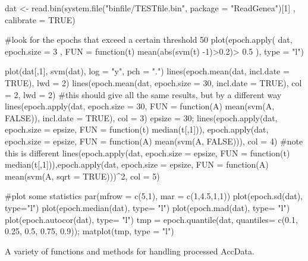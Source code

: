 \documentclass[a4paper]{book}
\begin{document}
%
\begin{Examples}
\begin{ExampleCode}

dat <- read.bin(system.file("binfile/TESTfile.bin", package = "ReadGenea")[1]
    , calibrate = TRUE)

#look for the epochs that exceed a certain threshold 50%
plot(epoch.apply( dat, epoch.size = 3 , 
    FUN = function(t) mean(abs(svm(t) -1)>0.2)> 0.5 ), type = "l")

plot(dat[,1], svm(dat), log = "y", pch = ".")
lines(epoch.mean(dat, incl.date = TRUE), lwd = 2)
lines(epoch.mean(dat, epoch.size = 30, incl.date = TRUE), col = 2, lwd = 2)
#this should give all the same results, but by a different way
lines(epoch.apply(dat, epoch.size = 30, 
    FUN = function(A) mean(svm(A, FALSE)), incl.date = TRUE), col = 3)
epsize = 30; lines(epoch.apply(dat, epoch.size = epsize, 
    FUN = function(t) median(t[,1])), epoch.apply(dat, epoch.size = epsize, 
    FUN = function(A) mean(svm(A, FALSE))), col = 4)
#note this is different
lines(epoch.apply(dat, epoch.size = epsize, 
    FUN = function(t) median(t[,1])),epoch.apply(dat, epoch.size = epsize, 
    FUN = function(A) mean(svm(A, sqrt = TRUE)))^2, col = 5)

#plot some statistics
par(mfrow = c(5,1), mar = c(1,4.5,1,1))
plot(epoch.sd(dat), type="l")
plot(epoch.median(dat), type= "l")
plot(epoch.mad(dat), type= "l")
plot(epoch.autocor(dat), type= "l")
tmp = epoch.quantile(dat, quantiles= c(0.1, 0.25, 0.5, 0.75, 0.9)); matplot(tmp, type = "l")


\end{ExampleCode}
\end{Examples}
\aliasA{[.AccData}{get.intervals}{[.AccData}
%
\begin{Description}\relax
A variety of functions and methods for handling processed AccData.
\end{Description}
%
\end{document}
